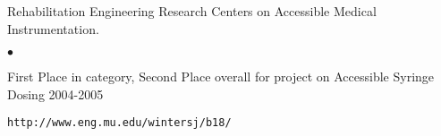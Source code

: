 \documentclass[margin,line]{res}
\newenvironment{list2}{
  \begin{list}{$\bullet$}{%
      \setlength{\itemsep}{0in}
      \setlength{\parsep}{0in} \setlength{\parskip}{0in}
      \setlength{\topsep}{0in} \setlength{\partopsep}{0in} 
      \setlength{\leftmargin}{0.2in}}}{\end{list}}
\begin{document}
\begin{resume}
Rehabilitation Engineering Research Centers on Accessible Medical
Instrumentation.
\begin{list2}
 \item First Place in category, Second Place overall for project on Accessible Syringe Dosing 2004-2005
 \item \begin{verbatim}http://www.eng.mu.edu/wintersj/b18/\end{verbatim}
\end{list2}
%





\end{resume}
\end{document}

